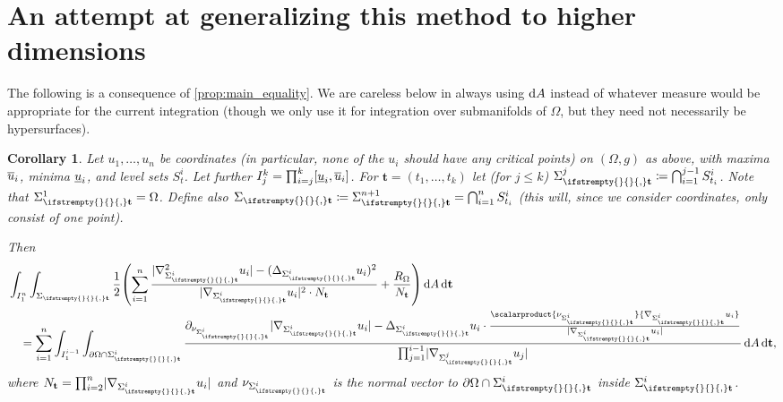 \documentclass[draft]{amsart}
\newtheorem{corollary}[theorem]{Corollary}
\newcommand*{\mathcomma}{,}
\newcommand*{\mathfullstop}{.}
\DeclarePairedDelimiter{\parens}{(}{)}
\let\p\parens %
\newcommand*{\definedas}{\coloneqq}
\newcommand*{\laplacian}{\Delta}
\newcommand*{\boundary}{\partial}
\DeclarePairedDelimiter{\abs}{\lvert}{\rvert} %
\begin{document}
\section{An attempt at generalizing this method to higher dimensions}
\newcommand{\vect}[1]{\mathbf{#1}}
\newcommand{\nestedLevelSet}[1][]{\Sigma_{\ifstrempty{#1}{}{#1,}\vect{t}}} 
\let\nls\nestedLevelSet
The following is a consequence of \cref{prop:main_equality}. We are careless below in always using \( \odif{A} \) instead of whatever measure would be appropriate for the current integration (though we only use it for integration over submanifolds of \( \Omega \), but they need not necessarily be hypersurfaces). 
\begin{corollary}\label{cor:higher_dim_main_equality_version}
    Let \( u_1,\dotsc,u_n \) be coordinates (in particular, none of the \( u_i \) should have any critical points) on \( (\Omega,g) \) as above, with maxima \( \overline{u}_i \), minima \( \underline{u}_i \), and level sets \( S_{t}^i  \). Let further \( I_j^k=\prod_{i=j}^{k}\interval{\minu_i}{\maxu_i} \). For \( \vect{t}=(t_1,\dotsc,t_k) \) let (for \( j\leq k \)) \( \nls^j\definedas \bigcap_{i=1}^{j-1} S_{t_i}^i \). Note that \( \nls^1=\Omega \). Define also \( \nls\definedas \nls^{n+1}=\bigcap_{i=1}^n S_{t_i}^i \) (this will, since we consider coordinates, only consist of one point).
    
    Then
    \begin{align*}
        &\int_{I_1^n}\int_{\nls}\frac{1}{2}\p*{\sum_{i=1}^{n}\frac{\abs{\nabla_{\nls^i}^2 u_i}-(\laplacian_{\nls^i}u_i)^2}{\abs{\nabla_{\nls^i}u_i}^2\cdot N_{\vect{t}}}+\frac{R_\Omega}{N_{\vect{t}}}}\odif{A}\odif{\vect{t}}\\
        &\quad=\sum_{i=1}^{n}\int_{I_1^{i-1}}\int_{\boundary{\Omega}\cap \nls^i}\frac{\partial_{\nu_{\nls^i}}\abs{\nabla_{\nls^i}u_i}-\laplacian_{\nls^i}u_i\cdot\frac{\scalarproduct{\nu_{\nls^i}}{\nabla_{\nls^i}u_i}}{\abs{\nabla_{\nls^i}u_i}}}{\prod_{j=1}^{i-1}\abs{\nabla_{\nls^j}u_j}}\odif{A}\odif{\vect{t}}\mathcomma
    \end{align*}
    where \( N_{\vect{t}}=\prod_{i=2}^{n}\abs{\nabla_{\nls^i} u_i} \) and \( \nu_{\nls^i} \) is the normal vector to \( \boundary{\Omega}\cap \nls^i \) inside \( \nls^{i} \).

\end{corollary}
\end{document}
